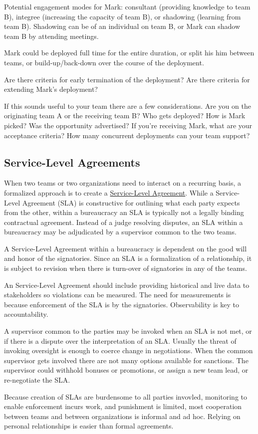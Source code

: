 Potential engagement modes for Mark: consultant (providing knowledge to team B), integree (increasing the capacity of team B), or shadowing (learning from team B). Shadowing can be of an individual on team B, or Mark can shadow team B by attending meetings. 


Mark could be deployed full time for the entire duration, or split his him between teams, or build-up/back-down over the course of the deployment.

Are there criteria for early termination of the deployment? Are there criteria for extending Mark's deployment?

If this sounds useful to your team there are a few considerations. Are you on the originating team A or the receiving team B? Who gets deployed? How is Mark picked? Was the opportunity advertised? If you're receiving Mark, what are your acceptance criteria? How many concurrent deployments can your team support?


\subsection*{Service-Level Agreements\label{sec:sla}}

When two teams or two organizations need to interact on a recurring basis, a formalized approach is to create a \href{https://en.wikipedia.org/wiki/Service-level_agreement}{Service-Level Agreement}. While a Service-Level Agreement (SLA) is constructive for outlining what each party expects from the other, within a bureaucracy an SLA is typically not a legally binding contractual agreement. Instead of a judge resolving disputes, an SLA within a bureaucracy may be adjudicated by a supervisor common to the two teams.

A Service-Level Agreement within a bureaucracy is dependent on the good will and honor of the signatories. Since an SLA is a formalization of a relationship, it is subject to revision when there is turn-over of signatories in any of the teams. 

An Service-Level Agreement should include providing historical and live data to stakeholders so violations can be measured. The need for measurements is because enforcement of the SLA is by the signatories. Observability is key to accountability. 

A supervisor common to the parties may be invoked when an SLA is not met, or if there is a dispute over the interpretation of an SLA. Usually the threat of invoking oversight is enough to coerce change in negotiations. 
When the common supervisor gets involved there are not many options available for sanctions. The supervisor could withhold bonuses or promotions, or assign a new team lead, or re-negotiate the SLA. 

Because creation of SLAs are burdensome to all parties invovled, monitoring to enable enforcement incurs work, and punishment is limited, most cooperation between teams and between organizations is informal and ad hoc. Relying on personal relationships is easier than formal agreements.

